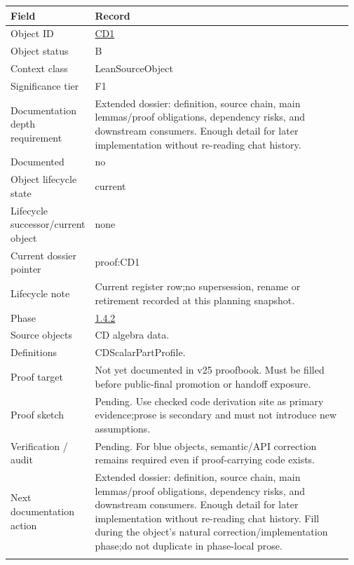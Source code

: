 \begin{longtable}{L{0.16\linewidth} L{0.81\linewidth}}
\hline
\textbf{Field} & \textbf{Record}\\
\hline
Object ID & \hyperlink{object-row-CD1}{CD1}\\
\hline\addlinespace[0.20em]
Object status & B\\
\hline\addlinespace[0.20em]
Context class & LeanSourceObject\\
\hline\addlinespace[0.20em]
Significance tier & F1\\
\hline\addlinespace[0.20em]
Documentation depth requirement & Extended dossier: definition, source chain, main lemmas/\allowbreak{}proof obligations, dependency risks, and downstream consumers. Enough detail for later implementation without re-reading chat history.\\
\hline\addlinespace[0.20em]
Documented & no\\
\hline\addlinespace[0.20em]
Object lifecycle state & current\\
\hline\addlinespace[0.20em]
Lifecycle successor/\allowbreak{}current object & none\\
\hline\addlinespace[0.20em]
Current dossier pointer & proof:CD1\\
\hline\addlinespace[0.20em]
Lifecycle note & Current register row;\newline no supersession, rename or retirement recorded at this planning snapshot.\\
\hline\addlinespace[0.20em]
Phase & \hyperlink{phase-row-1-4-2}{1.4.2}\\
\hline\addlinespace[0.20em]
Source objects & CD algebra data.\\
\hline\addlinespace[0.20em]
Definitions & CDScalarPartProfile.\\
\hline\addlinespace[0.20em]
Proof target & Not yet documented in v25 proofbook. Must be filled before public-final promotion or handoff exposure.\\
\hline\addlinespace[0.20em]
Proof sketch & Pending. Use checked code derivation site as primary evidence;\newline prose is secondary and must not introduce new assumptions.\\
\hline\addlinespace[0.20em]
Verification /\allowbreak{} audit & Pending. For blue objects, semantic/\allowbreak{}API correction remains required even if proof-carrying code exists.\\
\hline\addlinespace[0.20em]
Next documentation action & Extended dossier: definition, source chain, main lemmas/\allowbreak{}proof obligations, dependency risks, and downstream consumers. Enough detail for later implementation without re-reading chat history. Fill during the object's natural correction/\allowbreak{}implementation phase;\newline do not duplicate in phase-local prose.\\
\hline\addlinespace[0.20em]
\end{longtable}

